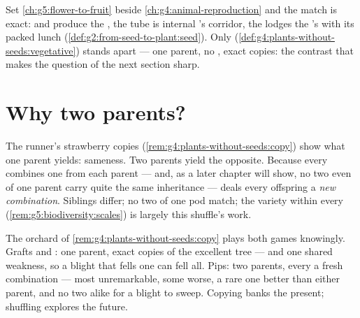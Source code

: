 \begin{remark}\label{rem:g8:sexual-reproduction:plants}
Set \cref{ch:g5:flower-to-fruit} beside
\cref{ch:g4:animal-reproduction} and the match is exact:
 and  produce the , the  tube is
internal 's corridor, the  lodges the
's  with its packed lunch
(\cref{def:g2:from-seed-to-plant:seed}). Only  (\cref{def:g4:plants-without-seeds:vegetative})
stands apart --- one parent, no , exact copies: the
contrast that makes the question of the next section
sharp.
\end{remark}

\section{Why two parents?}

\begin{proposition}\label{prop:g8:sexual-reproduction:shuffle}
The runner's strawberry copies
(\cref{rem:g4:plants-without-seeds:copy}) show what one
parent yields: sameness. Two parents yield the opposite.
Because every  combines one  from each parent
--- and, as a later chapter will show, no two  even
of one parent carry quite the same inheritance ---  deals every offspring a \emph{new
combination}. Siblings differ; no two  of one pod
match; the variety within every 
(\cref{rem:g5:biodiversity:scales}) is largely this
shuffle's work.
\end{proposition}
\admitted

\begin{example}\label{ex:g8:sexual-reproduction:bets}
The orchard of \cref{rem:g4:plants-without-seeds:copy}
plays both games knowingly. Grafts and : one
parent, exact copies of the excellent tree --- and one
shared weakness, so a blight that fells one can fell all.
Pips: two parents, every  a fresh combination ---
most unremarkable, some worse, a rare one better than
either parent, and no two alike for a blight to sweep.
Copying banks the present; shuffling explores the future.
\end{example}

